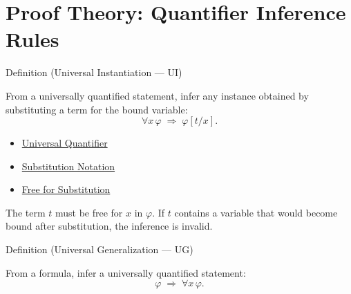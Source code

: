 
\section{Proof Theory: Quantifier Inference Rules}


\begin{definitionbox}{Definition (Universal Instantiation --- UI)}
\begin{definition}\label{def:ui}
From a universally quantified statement, infer any instance obtained by
substituting a term for the bound variable:
\[
\forall x\,\varphi \;\Rightarrow\; \varphi[t/x].
\]
\end{definition}
\end{definitionbox}

\begin{dependencies}
\begin{itemize}
  \item \hyperref[def:universal-q]{Universal Quantifier}
  \item \hyperref[def:subst-notation]{Substitution Notation}
  \item \hyperref[def:free-for]{Free for Substitution}
\end{itemize}
\end{dependencies}

\begin{remark*}
The term $t$ must be free for $x$ in $\varphi$. If $t$ contains a variable
that would become bound after substitution, the inference is invalid.
\end{remark*}

\begin{definitionbox}{Definition (Universal Generalization --- UG)}
\begin{definition}\label{def:ug}
From a formula, infer a universally quantified statement:
\[
\varphi \;\Rightarrow\; \forall x\,\varphi.
\]
\end{definition}
\end{definitionbox}

